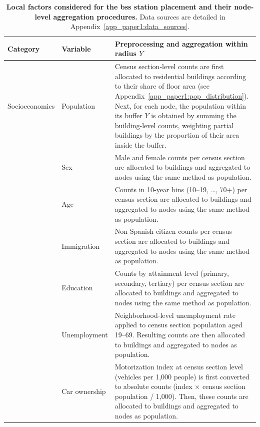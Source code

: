         \begin{table}[!htbp]
            \centering
            \caption[Local factors considered for the BSS station placement and their node-level aggregation procedures]{
                \textbf{Local factors considered for the \ac{bss} station placement and their node-level aggregation procedures.} Data sources are detailed in Appendix~\ref{app_paper1:data_sources}.
            }
            \label{table:local_factors_nodes}
            \scriptsize
            \renewcommand{\arraystretch}{1.2}
            \begin{tabular}{p{0.15\linewidth} p{0.12\linewidth} p{0.73\linewidth}}
                \toprule
                \textbf{Category} & \textbf{Variable} & \textbf{Preprocessing and aggregation within radius \(Y\)} \\
                \midrule
                Socioeconomics & Population 
                    & Census section-level counts are first allocated to residential buildings according to their share of floor area (see Appendix~\ref{app_paper1:pop_distribution}). Next, for each node, the population within its buffer \(Y\) is obtained by summing the building-level counts, weighting partial buildings by the proportion of their area inside the buffer.\\
                & Sex 
                    & Male and female counts per census section are allocated to buildings and aggregated to nodes using the same method as population. \\
                & Age 
                    & Counts in 10-year bins (10–19, …, 70+) per census section are allocated to buildings and aggregated to nodes using the same method as population. \\
                & Immigration 
                    & Non-Spanish citizen counts per census section are allocated to buildings and aggregated to nodes using the same method as population. \\
                & Education 
                    & Counts by attainment level (primary, secondary, tertiary) per census section are allocated to buildings and aggregated to nodes using the same method as population. \\
                & Unemployment 
                    & Neighborhood-level unemployment rate applied to census section population aged 19–69. Resulting counts are then allocated to buildings and aggregated to nodes as population. \\
                & Car ownership 
                    & Motorization index at census section level (vehicles per 1,000 people) is first converted to absolute counts (index × census section population / 1,000). Then, these counts are allocated to buildings and aggregated to nodes as population. \\

\end{tabular}
\end{table}
